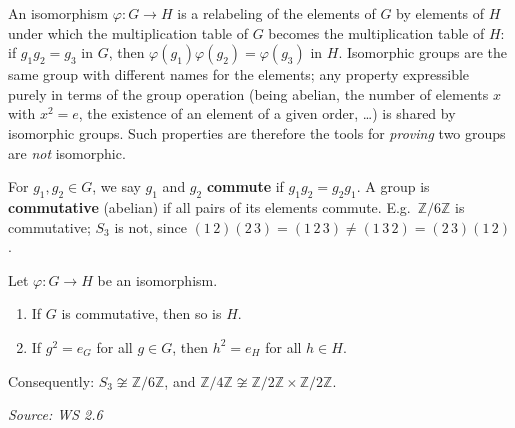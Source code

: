 \documentclass[11pt]{report}
\newcommand{\srcline}[1]{\par\hfill{\footnotesize\textit{Source: #1}}}
\begin{document}
\begin{rembox}\label{rem:what-isomorphic-means}
An isomorphism $\varphi: G \to H$ is a relabeling of the elements of $G$ by elements of $H$ under which the multiplication table of $G$ becomes the multiplication table of $H$: if $g_1 g_2 = g_3$ in $G$, then $\varphi(g_1)\varphi(g_2) = \varphi(g_3)$ in $H$. Isomorphic groups are the same group with different names for the elements; any property expressible purely in terms of the group operation (being abelian, the number of elements $x$ with $x^2 = e$, the existence of an element of a given order, \ldots) is shared by isomorphic groups. Such properties are therefore the tools for \emph{proving} two groups are \emph{not} isomorphic.
\end{rembox}

\begin{defbox}\label{def:commuting-elements}
For $g_1, g_2 \in G$, we say $g_1$ and $g_2$ \textbf{commute} if $g_1 g_2 = g_2 g_1$. A group is \textbf{commutative} (abelian) if all pairs of its elements commute. E.g.\ $\mathbb{Z}/6\mathbb{Z}$ is commutative; $S_3$ is not, since $(1\,2)(2\,3) = (1\,2\,3) \neq (1\,3\,2) = (2\,3)(1\,2)$.
\end{defbox}

\begin{propbox}\label{prop:two-isomorphism-invariants}
Let $\varphi: G \to H$ be an isomorphism.
\begin{enumerate}
    \item If $G$ is commutative, then so is $H$.
    \item If $g^2 = e_G$ for all $g \in G$, then $h^2 = e_H$ for all $h \in H$.
\end{enumerate}
Consequently: $S_3 \not\cong \mathbb{Z}/6\mathbb{Z}$, and $\mathbb{Z}/4\mathbb{Z} \not\cong \mathbb{Z}/2\mathbb{Z} \times \mathbb{Z}/2\mathbb{Z}$.
\srcline{WS 2.6}
\end{propbox}
\end{document}
